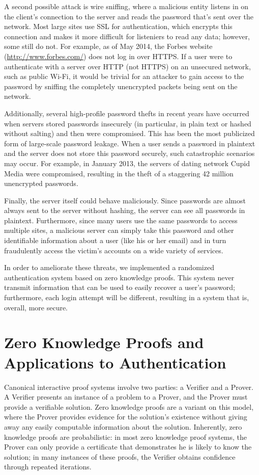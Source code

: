 \documentclass[11pt]{article}
\begin{document}
A second possible attack is wire sniffing, where a malicious entity listens in on the client's connection to the server and reads the password that's sent over the network\cite{Lum}. Most large sites use SSL for authentication, which encrypts this connection and makes it more difficult for listeniers to read any data; however, some still do not. For example, as of May 2014, the Forbes website (\url{http://www.forbes.com/}) does not log in over HTTPS. If a user were to authenticate with a server over HTTP (not HTTPS) on an unsecured network, such as public Wi-Fi, it would be trivial for an attacker to gain access to the password by sniffing the completely unencrypted packets being sent on the network. 

Additionally, several high-profile password thefts in recent years have occurred when servers stored passwords insecurely (in particular, in plain text or hashed without salting) and then were compromised.  This has been the most publicized form of large-scale password leakage.  When a user sends a password in plaintext and the server does not store this password securely, such catastrophic scenarios may occur.  For example, in January 2013, the servers of dating network Cupid Media were compromised, resulting in the theft of a staggering 42 million unencrypted passwords.  \cite{Donohue}

Finally, the server itself could behave maliciously. Since passwords are almost always sent to the server without hashing, the server can see all passwords in plaintext. Furthermore, since many users use the same passwords to access multiple sites, a malicious server can simply take this password and other identifiable information about a user (like his or her email) and in turn fraudulently access the victim's accounts on a wide variety of services.

In order to ameliorate these threats, we implemented a randomized authentication system based on zero knowledge proofs. This system never transmit information that can be used to easily recover a user's password; furthermore, each login attempt will be different, resulting in a system that is, overall, more secure.

\section{Zero Knowledge Proofs and Applications to Authentication}

Canonical interactive proof systems involve two parties: a Verifier and a Prover\cite{Goldwasser}.  A Verifier presents an instance of a problem to a Prover, and the Prover must provide a verifiable solution. Zero knowledge proofs are a variant on this model, where the Prover provides evidence for the solution's existence without giving away any easily computable information about the solution.  Inherently, zero knowledge proofs are probabilistic: in most zero knowledge proof systems, the Prover can only provide a certificate that demonstrates he is likely to know the solution; in many instances of these proofs, the Verifier obtains confidence through repeated iterations.
\end{document}
